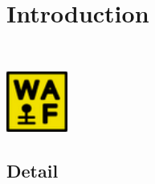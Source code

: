 \section{Introduction}
\lipsum[1]~\cite{texbook}

\includegraphics[width=2cm]{figs/waf-logo.png}

\subsection{Detail}
\lipsum[2]~\cite{btxdoc}

\lipsum[3]~\cite{latexbook}

\lipsum[4]
